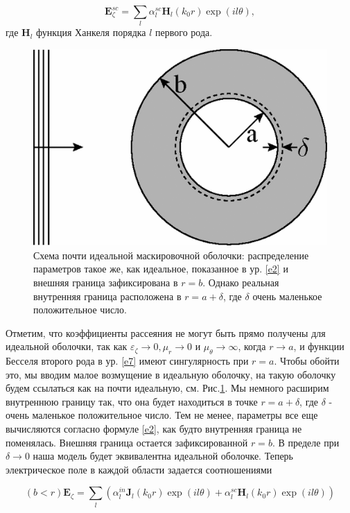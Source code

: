 \documentclass[a4paper, 12pt]{article}
\begin{document}
\begin{equation}\label{e9}
	\mathbf{E}_\zeta^{sc} = \sum\limits_l \alpha_l^{sc} \mathbf{H}_l(k_0 r)\exp(il\theta),
\end{equation}
где $\mathbf{H}_l$ функция Ханкеля порядка $l$ первого рода.

\begin{figure}[t]
  \centering
  \includegraphics[height=0.15\paperheight]{1.png}
  \caption{Схема почти идеальной маскировочной оболочки: распределение параметров такое же, как идеальное, показанное в
  ур. \eqref{e2} и внешняя граница зафиксирована в $r=b$. Однако реальная внутренняя граница расположена в 
  $r=a +\delta$, где $\delta$ очень маленькое положительное число.}
  \label{fig:1}
\end{figure}

Отметим, что коэффициенты рассеяния не могут быть прямо получены для идеальной оболочки, так как $\varepsilon_\zeta \to 0,
\mu_r \to 0$ и $\mu_\theta \to \infty$, когда $r \to a$, и функции Бесселя второго рода в ур. \eqref{e7} имеют 
сингулярность при $r = a$. Чтобы обойти это, мы вводим малое возмущение в идеальную оболочку, на такую оболочку будем
ссылаться как на почти идеальную, см. Рис.\ref{fig:1}.  Мы немного расширим внутреннюю границу так, что она будет
находиться в точке $r = a + \delta$, где $\delta$ - очень маленькое положительное число. Тем не менее, параметры все еще
вычисляются согласно формуле \eqref{e2}, как будто внутренняя граница не поменялась. Внешняя граница остается
зафиксированной $r = b$. В пределе при $\delta \to 0$ наша модель будет эквивалентна идеальной оболочке. Теперь электрическое
поле в каждой области задается соотношениями

\begin{equation*}
	(b<r)\mathbf{E}_\zeta = \sum\limits_l (\alpha_l^{in} \mathbf{J}_l(k_0 r)\exp(il\theta) +
								\alpha_l^{sc} \mathbf{H}_l(k_0 r)\exp(il\theta))
\end{equation*}
 
\end{document}
